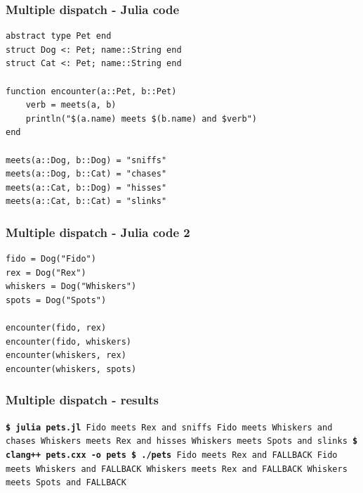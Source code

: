 \documentclass{beamer}
\def\\{}%
\begin{document}
\begin{frame}[fragile]
    \frametitle{Multiple dispatch - Julia code}

\begin{verbatim}
abstract type Pet end
struct Dog <: Pet; name::String end
struct Cat <: Pet; name::String end

function encounter(a::Pet, b::Pet)
    verb = meets(a, b)
    println("$(a.name) meets $(b.name) and $verb")
end

meets(a::Dog, b::Dog) = "sniffs"
meets(a::Dog, b::Cat) = "chases"
meets(a::Cat, b::Dog) = "hisses"
meets(a::Cat, b::Cat) = "slinks"
\end{verbatim}
\end{frame}


\begin{frame}[fragile]
    \frametitle{Multiple dispatch - Julia code 2}

\begin{verbatim}
fido = Dog("Fido")
rex = Dog("Rex")
whiskers = Dog("Whiskers")
spots = Dog("Spots")

encounter(fido, rex)
encounter(fido, whiskers)
encounter(whiskers, rex)
encounter(whiskers, spots)
\end{verbatim}
\end{frame}

\begin{frame}
    \frametitle{Multiple dispatch - results}
    {\tt {\bf \$ julia pets.jl} \\
    Fido meets Rex and sniffs \\
    Fido meets Whiskers and chases \\
    Whiskers meets Rex and hisses \\
    Whiskers meets Spots and slinks \\ \\
    {\bf\$ clang++ pets.cxx -o pets \\
    \$ ./pets}\\
    Fido meets Rex and FALLBACK \\
    Fido meets Whiskers and FALLBACK \\
    Whiskers meets Rex and FALLBACK \\
    Whiskers meets Spots and FALLBACK
    }

    

\end{frame}
\end{document}
